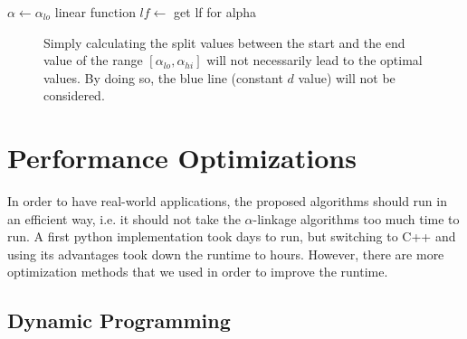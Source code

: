 \begin{algorithm}[H]
    $\alpha \gets \alpha_{lo}$\;
    linear function $lf \gets$ get lf for alpha\;
    \caption{}
    \label{alg:alphalinkage4}
\end{algorithm}

\begin{figure}[H]
    \centering
    \caption{Simply calculating the split values between the start and the end value of the range $[\alpha_{lo}, \alpha_{hi}]$ will not necessarily lead to the optimal values. By doing so, the blue line (constant $d$ value) will not be considered.}
    \label{fig:optimal}
\end{figure}

\section{Performance Optimizations}

In order to have real-world applications, the proposed algorithms should run in an efficient way, i.e. it should not take the $\alpha$-linkage algorithms too much time to run. A first python implementation took days to run, but switching to C++ and using its advantages took down the runtime to hours. However, there are more optimization methods that we used in order to improve the runtime.

\subsection{Dynamic Programming}

